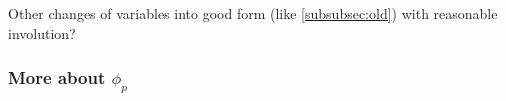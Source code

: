 \documentclass{rs}
\theoremstyle{definition}
\theoremstyle{remark}
\newcommand{\A}{\alpha}
\newcommand{\B}{\beta}
\renewcommand{\=}{\approx}
\renewcommand{\-}{\sim}
\newcommand{\rd}[1]{\textcolor{red}{#1}}
\renewcommand{\c}[2]{{#1 \choose #2}}
\numberwithin{equation}{section}
\numberwithin{thm}{section}
\begin{document}
\begin{enumerate}[(i)]

 Other changes of variables into good form (like \ref{subsubsec:old}) with reasonable involution?  
\end{enumerate}

\subsubsection{More about $\phi_p$}
\label{subsubsec:morephip}
\end{document}
